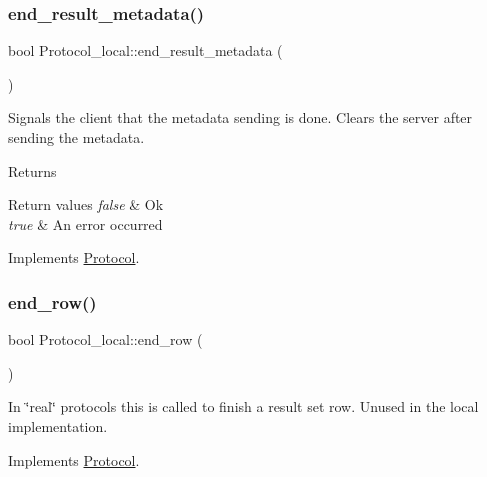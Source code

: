\subsubsection{\texorpdfstring{end\+\_\+result\+\_\+metadata()}{end\_result\_metadata()}}
{\footnotesize\ttfamily bool Protocol\+\_\+local\+::end\+\_\+result\+\_\+metadata (\begin{DoxyParamCaption}{ }\end{DoxyParamCaption})\hspace{0.3cm}{\ttfamily [virtual]}}

Signals the client that the metadata sending is done. Clears the server after sending the metadata.

\begin{DoxyReturn}{Returns}

\end{DoxyReturn}

\begin{DoxyRetVals}{Return values}
{\em false} & Ok \\
\hline
{\em true} & An error occurred \\
\hline
\end{DoxyRetVals}


Implements \mbox{\hyperlink{classProtocol_a48bb540f0317bf418c129f441f2e82b9}{Protocol}}.

\mbox{\label{classProtocol__local_a45337395c28d59b1f0aa1d95ab14eec5}} 
\subsubsection{\texorpdfstring{end\+\_\+row()}{end\_row()}}
{\footnotesize\ttfamily bool Protocol\+\_\+local\+::end\+\_\+row (\begin{DoxyParamCaption}{ }\end{DoxyParamCaption})\hspace{0.3cm}{\ttfamily [virtual]}}

In \char`\"{}real\char`\"{} protocols this is called to finish a result set row. Unused in the local implementation. 

Implements \mbox{\hyperlink{classProtocol}{Protocol}}.

\mbox{\label{classProtocol__local_a9b6d4b8d61490809b99080455b359189}} 
